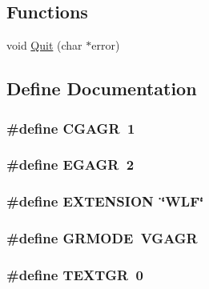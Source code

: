 \subsection*{Functions}
\begin{DoxyCompactItemize}
\item 
void \hyperlink{ID__HEAD_8H_a66ba47a93e3e25204f4d72aee7614201}{Quit} (char $\ast$error)
\end{DoxyCompactItemize}


\subsection{Define Documentation}
\hypertarget{ID__HEAD_8H_a045d990095288b25b52f2070ff2039cc}{
\subsubsection[{CGAGR}]{\setlength{\rightskip}{0pt plus 5cm}\#define CGAGR~1}}
\label{ID__HEAD_8H_a045d990095288b25b52f2070ff2039cc}
\hypertarget{ID__HEAD_8H_a71430ee3dc4354e7efe5e73dca3adef1}{
\subsubsection[{EGAGR}]{\setlength{\rightskip}{0pt plus 5cm}\#define EGAGR~2}}
\label{ID__HEAD_8H_a71430ee3dc4354e7efe5e73dca3adef1}
\hypertarget{ID__HEAD_8H_a7489acf4773e622a802155319f0533e8}{
\subsubsection[{EXTENSION}]{\setlength{\rightskip}{0pt plus 5cm}\#define EXTENSION~\char`\"{}WLF\char`\"{}}}
\label{ID__HEAD_8H_a7489acf4773e622a802155319f0533e8}
\hypertarget{ID__HEAD_8H_a527063f32c8f25143b04f53ac1782a60}{
\subsubsection[{GRMODE}]{\setlength{\rightskip}{0pt plus 5cm}\#define GRMODE~VGAGR}}
\label{ID__HEAD_8H_a527063f32c8f25143b04f53ac1782a60}
\hypertarget{ID__HEAD_8H_ab90640f67729ad8aaf1259890da41991}{
\subsubsection[{TEXTGR}]{\setlength{\rightskip}{0pt plus 5cm}\#define TEXTGR~0}}
